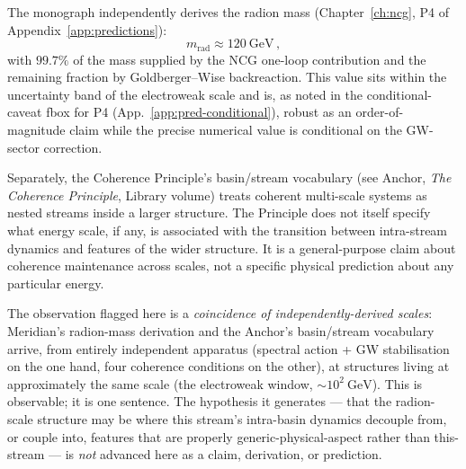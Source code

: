 \noindent{}

\medskip

The monograph independently derives the radion mass (Chapter~\ref{ch:ncg}, P4 of Appendix~\ref{app:predictions}):
\begin{equation}
  m_\mathrm{rad} \approx 120~\mathrm{GeV}\,,
\end{equation}
with $99.7\%$ of the mass supplied by the NCG one-loop contribution and the remaining fraction by Goldberger--Wise backreaction.  This value sits within the uncertainty band of the electroweak scale and is, as noted in the conditional-caveat fbox for P4 (App.~\ref{app:pred-conditional}), robust as an order-of-magnitude claim while the precise numerical value is conditional on the GW-sector correction.

Separately, the Coherence Principle's basin/stream vocabulary (see Anchor, \emph{The Coherence Principle}, Library volume) treats coherent multi-scale systems as nested streams inside a larger structure.  The Principle does not itself specify what energy scale, if any, is associated with the transition between intra-stream dynamics and features of the wider structure.  It is a general-purpose claim about coherence maintenance across scales, not a specific physical prediction about any particular energy.

The observation flagged here is a \emph{coincidence of independently-derived scales}: Meridian's radion-mass derivation and the Anchor's basin/stream vocabulary arrive, from entirely independent apparatus (spectral action + GW stabilisation on the one hand, four coherence conditions on the other), at structures living at approximately the same scale (the electroweak window, $\sim 10^2~\mathrm{GeV}$).  This is observable; it is one sentence.  The hypothesis it generates --- that the radion-scale structure may be where this stream's intra-basin dynamics decouple from, or couple into, features that are properly generic-physical-aspect rather than this-stream --- is \emph{not} advanced here as a claim, derivation, or prediction.

